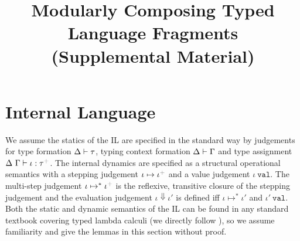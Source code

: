 \documentclass[12pt]{article}
\newcommand{\moutput}{^{\color{gray}+}}
\begin{document}

\title{Modularly Composing Typed Language Fragments (Supplemental Material)}

\author{ }


\trnumber{ }

\maketitle


\section{Internal Language}
We assume the statics of the IL are specified in the standard way by judgements for  type formation {$\Delta \vdash \tau$}, typing context formation { $\Delta \vdash \Gamma$} and type assignment {$\iDelta~\iGamma \vdash \iota : \tau\moutput$}. 
The internal dynamics are specified as a structural operational semantics with a stepping judgement {\small $\iota \mapsto \iota\moutput$} and a value judgement {$\iota~\mathtt{val}$}. The multi-step judgement $\iota \mapsto^{*} \iota\moutput$ is the reflexive, transitive closure of the stepping judgement and the evaluation judgement $\iota \Downarrow \iota'$ is defined iff $\iota \mapsto^{*} \iota'$ and $\iota'~\mathtt{val}$. Both the static and dynamic semantics of the IL can be found in any standard textbook covering typed lambda calculi (we directly follow \cite{pfpl}), so we assume familiarity and give the lemmas in this section without proof.
\end{document}
